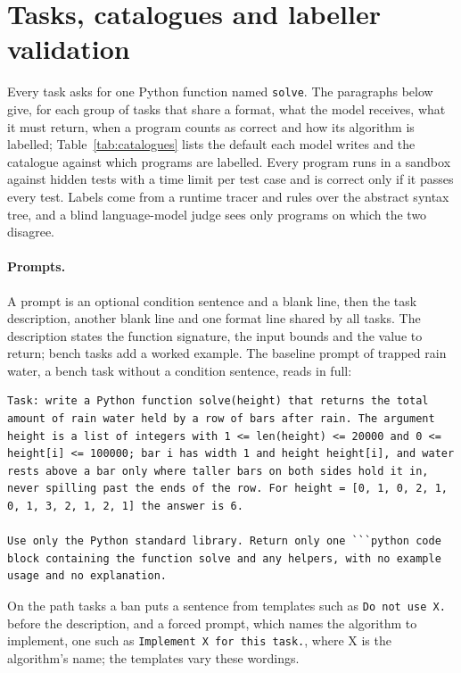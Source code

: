 \documentclass[11pt,letterpaper]{article}
\begin{document}



\clearpage
\appendix

\section{Tasks, catalogues and labeller validation}
\label{app:tasks}

Every task asks for one Python function named \texttt{solve}. The paragraphs below give, for each group of tasks that share a format, what the model receives, what it must return, when a program counts as correct and how its algorithm is labelled; Table~\ref{tab:catalogues} lists the default each model writes and the catalogue against which programs are labelled. Every program runs in a sandbox against hidden tests with a time limit per test case and is correct only if it passes every test. Labels come from a runtime tracer and rules over the abstract syntax tree, and a blind language-model judge sees only programs on which the two disagree.

\paragraph{Prompts.} A prompt is an optional condition sentence and a blank line, then the task description, another blank line and one format line shared by all tasks. The description states the function signature, the input bounds and the value to return; bench tasks add a worked example. The baseline prompt of trapped rain water, a bench task without a condition sentence, reads in full:
\begin{lstlisting}[basicstyle=\footnotesize\ttfamily, breaklines=true, columns=fullflexible, keepspaces=true, upquote=true, frame=single, xleftmargin=4pt, xrightmargin=4pt]
Task: write a Python function solve(height) that returns the total amount of rain water held by a row of bars after rain. The argument height is a list of integers with 1 <= len(height) <= 20000 and 0 <= height[i] <= 100000; bar i has width 1 and height height[i], and water rests above a bar only where taller bars on both sides hold it in, never spilling past the ends of the row. For height = [0, 1, 0, 2, 1, 0, 1, 3, 2, 1, 2, 1] the answer is 6.

Use only the Python standard library. Return only one ```python code block containing the function solve and any helpers, with no example usage and no explanation.
\end{lstlisting}
On the path tasks a ban puts a sentence from templates such as \texttt{Do not use  X.} before the description, and a forced prompt, which names the algorithm to implement, one such as \texttt{Implement  X\ for this task.}, where X is the algorithm's name; the templates vary these wordings.
\end{document}
